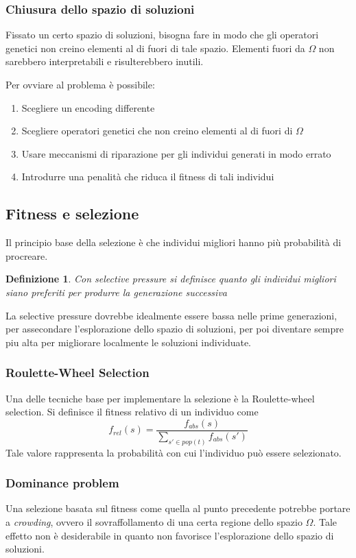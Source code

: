 \documentclass[a4paper]{article}
\newtheorem{definition}{Definizione}
\begin{document}
\subsubsection{Chiusura dello spazio di soluzioni}
Fissato un certo spazio di soluzioni, bisogna fare in modo che gli operatori 
genetici non creino elementi al di fuori di tale spazio.
Elementi fuori da $\Omega$ non sarebbero interpretabili e risulterebbero inutili.

Per ovviare al problema è possibile:
\begin{enumerate}
    \item Scegliere un encoding differente
    \item Scegliere operatori genetici che non creino elementi al di fuori di $\Omega$
    \item Usare meccanismi di riparazione per gli individui generati in modo errato
    \item Introdurre una penalità che riduca il fitness di tali individui
\end{enumerate}

\subsection{Fitness e selezione}
Il principio base della selezione è che individui migliori hanno più probabilità
di procreare. 
\begin{definition}
    Con selective pressure si definisce quanto gli individui migliori 
    siano preferiti per produrre la generazione successiva
\end{definition}
La selective pressure dovrebbe idealmente essere bassa nelle prime generazioni, 
per assecondare l'esplorazione dello spazio di soluzioni, per poi diventare sempre 
piu alta per migliorare localmente le soluzioni individuate.

\subsubsection{Roulette-Wheel Selection}
Una delle tecniche base per implementare la selezione è la Roulette-wheel selection.
Si definisce il fitness relativo di un individuo come 
$$ 
f_{rel}(s) = \frac{f_{abs}(s)}{\sum_{s\prime\in pop(t)} f_{abs}(s\prime)}
$$
Tale valore rappresenta la probabilità con cui l'individuo può essere selezionato.

\subsubsection{Dominance problem}
Una selezione basata sul fitness come quella al punto precedente potrebbe portare a \emph{crowding}, ovvero
il sovraffollamento di una certa regione dello spazio $\Omega$.
Tale effetto non è desiderabile in quanto non favorisce l'esplorazione dello spazio di soluzioni.
\end{document}
